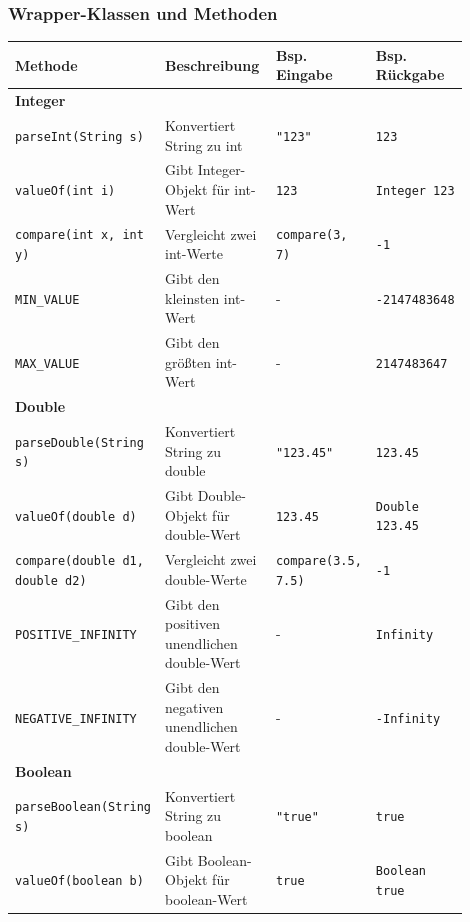 \documentclass[a4paper,10pt, dvipsnames]{report}
\newcommand{\javaInLine}[1]{\texttt{#1}}
\begin{document}
\subsubsection{Wrapper-Klassen und Methoden}

\small

\begin{longtable}{|p{0.3\linewidth}|p{0.3\linewidth}|p{0.15\linewidth}|p{0.15\linewidth}|}
\hline
\textbf{Methode} & \textbf{Beschreibung} & \textbf{Bsp. Eingabe} & \textbf{Bsp. Rückgabe} \\
\hline
\endhead

\multicolumn{4}{|l|}{\textbf{Integer}} \\
\hline
\javaInLine{parseInt(String s)} & Konvertiert String zu int & \javaInLine{"123"} & \javaInLine{123} \\
\javaInLine{valueOf(int i)} & Gibt Integer-Objekt für int-Wert & \javaInLine{123} & \javaInLine{Integer 123} \\
\javaInLine{compare(int x, int y)} & Vergleicht zwei int-Werte & \javaInLine{compare(3, 7)} & \javaInLine{-1} \\
\javaInLine{MIN_VALUE} & Gibt den kleinsten int-Wert & - & \javaInLine{-2147483648} \\
\javaInLine{MAX_VALUE} & Gibt den größten int-Wert & - & \javaInLine{2147483647} \\
\hline

\multicolumn{4}{|l|}{\textbf{Double}} \\
\hline
\javaInLine{parseDouble(String s)} & Konvertiert String zu double & \javaInLine{"123.45"} & \javaInLine{123.45} \\
\javaInLine{valueOf(double d)} & Gibt Double-Objekt für double-Wert & \javaInLine{123.45} & \javaInLine{Double 123.45} \\
\javaInLine{compare(double d1, double d2)} & Vergleicht zwei double-Werte & \javaInLine{compare(3.5, 7.5)} & \javaInLine{-1} \\
\javaInLine{POSITIVE_INFINITY} & Gibt den positiven unendlichen double-Wert & - & \javaInLine{Infinity} \\
\javaInLine{NEGATIVE_INFINITY} & Gibt den negativen unendlichen double-Wert & - & \javaInLine{-Infinity} \\
\hline

\multicolumn{4}{|l|}{\textbf{Boolean}} \\
\hline
\javaInLine{parseBoolean(String s)} & Konvertiert String zu boolean & \javaInLine{"true"} & \javaInLine{true} \\
\javaInLine{valueOf(boolean b)} & Gibt Boolean-Objekt für boolean-Wert & \javaInLine{true} & \javaInLine{Boolean true} \\
\hline


\end{longtable}
\end{document}
